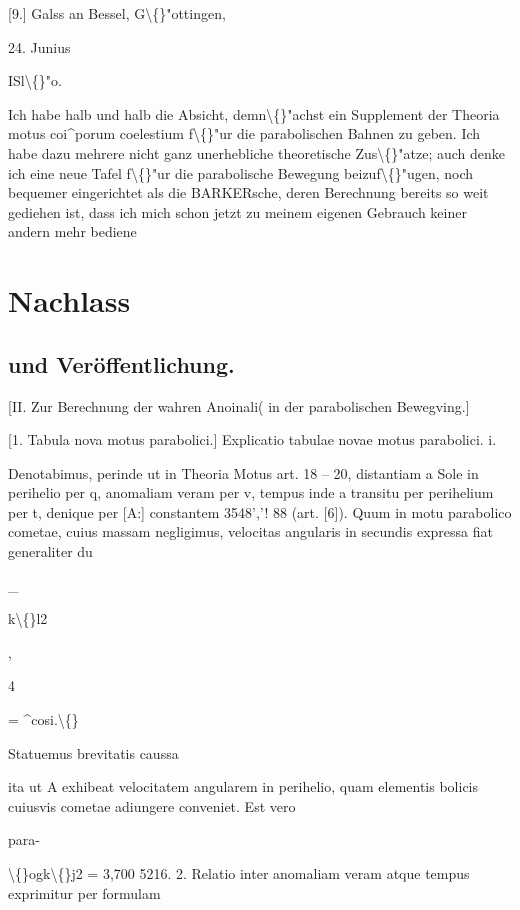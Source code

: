 \documentclass[10pt,a4paper]{article}
\begin{document}
[9.]
Galss an Bessel, G\textbackslash\{\}"ottingen,

24. Junius

ISl\textbackslash\{\}"o.

Ich habe halb und halb die Absicht, demn\textbackslash\{\}"achst ein Supplement
der Theoria motus coi\textasciicircum{}porum coelestium f\textbackslash\{\}"ur die parabolischen Bahnen zu
geben. Ich habe dazu mehrere nicht ganz unerhebliche theoretische Zus\textbackslash\{\}"atze;
auch denke ich eine neue Tafel f\textbackslash\{\}"ur die parabolische Bewegung beizuf\textbackslash\{\}"ugen,
noch bequemer eingerichtet als die BARKERsche, deren Berechnung bereits so
weit gediehen ist, dass ich mich schon jetzt zu meinem eigenen Gebrauch
keiner andern mehr bediene

\newpage
\section*{Nachlass}

\subsection*{und Ver\"offentlichung.}

[II. Zur Berechnung der wahren Anoinali(
in der parabolischen Bewegving.]

[1. Tabula nova motus parabolici.]
Explicatio tabulae novae motus parabolici.
i.

Denotabimus, perinde ut in Theoria Motus art. 18 -- 20, distantiam a Sole
in perihelio per q, anomaliam veram per v, tempus inde a transitu per perihelium per t, denique per [A:] constantem 3548','! 88 (art. [6]). Quum in motu
parabolico cometae, cuius massam negligimus, velocitas angularis in secundis
expressa fiat generaliter
du

\_

k\textbackslash\{\}l2

,

4

= \textasciicircum{}cosi.\textbackslash\{\}

Statuemus brevitatis caussa

ita ut A exhibeat velocitatem angularem in perihelio, quam elementis
bolicis cuiusvis cometae adiungere conveniet.
Est vero

para-

\textbackslash\{\}ogk\textbackslash\{\}j2 = 3,700 5216.
2.
Relatio inter anomaliam veram atque tempus exprimitur per formulam
\end{document}
